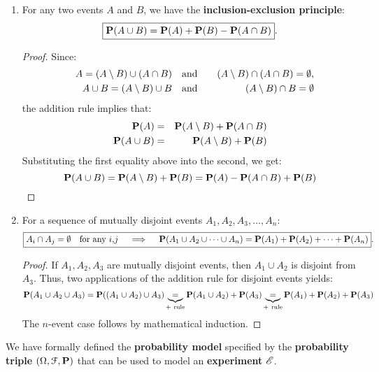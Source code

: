 \begin{enumerate}
\item For any two events $A$ and $B$, we have the {\bf inclusion-exclusion principle}:
\[
\boxed{
\mathbf{P}(A \cup B) = \mathbf{P}(A) + \mathbf{P}(B) - \mathbf{P}(A \cap B)
}.
\]
{\scriptsize
\begin{proof}
Since: 
\begin{eqnarray}
\quad A = (A \setminus B) \cup (A \cap B) & \quad \text{and} \quad & (A \setminus B) \cap (A \cap B) = \emptyset, \notag \\
\quad A \cup B = (A \setminus B) \cup B & \quad \text{and} \quad & (A \setminus B) \cap B = \emptyset \notag
\end{eqnarray}
the addition rule implies that:
\begin{eqnarray}
\mathbf{P}(A) &=& \mathbf{P}(A \setminus B) + \mathbf{P}(A \cap B) \notag \\
\mathbf{P}(A \cup B) &=& \mathbf{P}(A \setminus B) + \mathbf{P}(B) \notag
\end{eqnarray}
Substituting the first equality above into the second, we get:
\[
\mathbf{P}(A \cup B) = \mathbf{P}(A \setminus B) + \mathbf{P}(B) = \mathbf{P}(A) - \mathbf{P}(A \cap B) + \mathbf{P}(B)
\]
\end{proof}
}
\item For a sequence of mutually disjoint events $A_1, A_2, A_3, \ldots, A_n$: 
\[
\boxed{
A_i \cap A_j = \emptyset \quad \text{for any $i$,$j$} \quad \implies \quad \mathbf{P}(A_1 \cup A_2 \cup \cdots \cup A_n) = \mathbf{P}(A_1)+\mathbf{P}(A_2)+ \cdots + \mathbf{P}(A_n)} .
\]
{\scriptsize
\begin{proof}
If $A_1, A_2, A_3$ are mutually disjoint events, then $A_1 \cup A_2$ is disjoint from $A_3$.  Thus, two applications of the addition rule for disjoint events yields:
\[
\mathbf{P}(A_1 \cup A_2 \cup A_3) = \mathbf{P}((A_1 \cup A_2) \cup A_3) \underbrace{=}_{+~\text{rule}} \mathbf{P}(A_1 \cup A_2) + \mathbf{P}(A_3) \underbrace{=}_{+~\text{rule}}  \mathbf{P}(A_1) + \mathbf{P}(A_2) + \mathbf{P}(A_3)
\]
The $n$-event case follows by mathematical induction.
\end{proof}
}
\end{enumerate}

We have formally defined the {\bf probability model} specified by the {\bf probability triple} $(\Omega, \mathcal{F},\mathbf{P})$ that can be used to model an {\bf experiment} $\mathscr{E}$.

